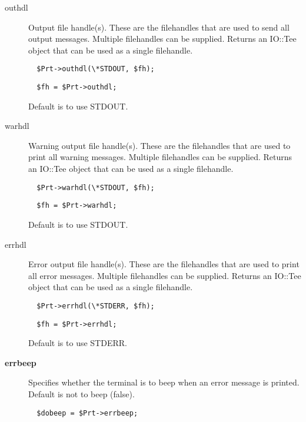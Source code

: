 \begin{description}
\begin{description}
\item[{outhdl}] \mbox{}

Output file handle(s). These are the filehandles that are used
to send all output messages. Multiple filehandles can be supplied.
Returns an IO::Tee object that can be used as a single filehandle.

\begin{verbatim}
  $Prt->outhdl(\*STDOUT, $fh);
\end{verbatim}
\begin{verbatim}
  $fh = $Prt->outhdl;
\end{verbatim}


Default is to use STDOUT.


\item[{warhdl}] \mbox{}

Warning output file handle(s). These are the filehandles that are used
to print all warning messages. Multiple filehandles can be supplied.
Returns an IO::Tee object that can be used as a single filehandle.

\begin{verbatim}
  $Prt->warhdl(\*STDOUT, $fh);
\end{verbatim}
\begin{verbatim}
  $fh = $Prt->warhdl;
\end{verbatim}


Default is to use STDOUT.


\item[{errhdl}] \mbox{}

Error output file handle(s). These are the filehandles that are used
to print all error messages. Multiple filehandles can be supplied.
Returns an IO::Tee object that can be used as a single filehandle.

\begin{verbatim}
  $Prt->errhdl(\*STDERR, $fh);
\end{verbatim}
\begin{verbatim}
  $fh = $Prt->errhdl;
\end{verbatim}


Default is to use STDERR.


\item[{\textbf{errbeep}}] \mbox{}

Specifies whether the terminal is to beep when an error
message is printed. Default is not to beep (false).

\begin{verbatim}
  $dobeep = $Prt->errbeep;
\end{verbatim}


\end{description}
\end{description}
